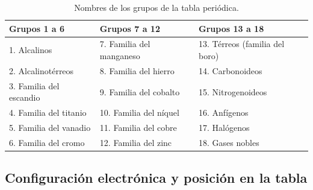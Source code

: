 \begin{table}[H]
    \centering
    \begin{tabular}{@{}lll@{}}
        \toprule
        \textbf{Grupos 1 a 6} & \textbf{Grupos 7 a 12} & \textbf{Grupos 13 a 18} \\
        \midrule
        1. Alcalinos & 7. Familia del manganeso & 13. Térreos (familia del boro) \\[3pt]
        2. Alcalinotérreos & 8. Familia del hierro & 14. Carbonoideos \\[3pt]
        3. Familia del escandio & 9. Familia del cobalto & 15. Nitrogenoideos \\[3pt]
        4. Familia del titanio & 10. Familia del níquel & 16. Anfígenos \\[3pt]
        5. Familia del vanadio & 11. Familia del cobre & 17. Halógenos \\[3pt]
        6. Familia del cromo & 12. Familia del zinc & 18. Gases nobles \\
        \bottomrule
    \end{tabular}
    \caption{Nombres de los grupos de la tabla periódica.}
    \label{tab:nombres_grupos}
\end{table}

\subsection{Configuración electrónica y posición en la tabla}

